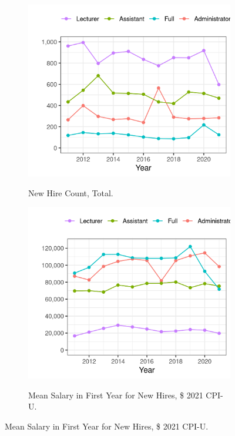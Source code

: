 \documentclass[notitlepage,12pt]{article}
\begin{document}
\begin{figure}[h!]
    \centering
    \caption{Trends in New Hires at Illinois Public Universities 2011-2021.}
    \begin{subfigure}[b]{0.495\textwidth}
        \centering
        \caption{New Hire Count, Total.}
        \includegraphics[width=\textwidth]{figures/newhire-count-illinois.png}
        \label{fig:newhire-count-illinois}
    \end{subfigure}
    \begin{subfigure}[b]{0.495\textwidth}
        \centering
        \caption{Mean Salary in First Year for New Hires, \$ 2021 CPI-U.}
        \includegraphics[width=\textwidth]{figures/newhire-salary-illinois.png}
        \label{fig:newhire-salary-illinois}
    \end{subfigure}
    \label{fig:newhire-illinois}
\end{figure}
\end{document}
